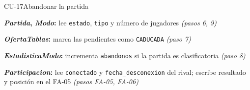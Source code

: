 \begin{fichacu}{CU-17}{Abandonar la partida}
{\begin{cudatos}
      \item \textbf{\textit{Partida}, \textit{Modo}:} lee \texttt{estado}, \texttt{tipo} y número de jugadores \textit{(pasos 6, 9)}
      \item \textbf{\textit{OfertaTablas}:} marca las pendientes como \texttt{CADUCADA} \textit{(paso 7)}
      \item \textbf{\textit{EstadisticaModo}:} incrementa \texttt{abandonos} si la partida es clasificatoria \textit{(paso 8)}
      \item \textbf{\textit{Participacion}:} lee \texttt{conectado} y \texttt{fecha\_\allowbreak{}desconexion} del rival; escribe resultado y posición en el \mbox{FA-05} \textit{(pasos \mbox{FA-05}, \mbox{FA-06})}
    \end{cudatos}} \\ \hline
\end{fichacu}
\clearpage
